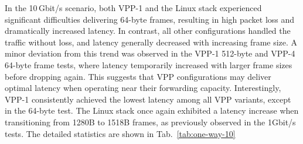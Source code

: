In the 10\,Gbit/s scenario, both VPP-1 and the Linux stack experienced significant difficulties delivering 64-byte frames, resulting in high packet loss and dramatically increased latency.
In contrast, all other configurations handled the traffic without loss, and latency generally decreased with increasing frame size.
A minor deviation from this trend was observed in the VPP-1 512-byte and VPP-4 64-byte frame tests, where latency temporarily increased with larger frame sizes before dropping again.
This suggests that VPP configurations may deliver optimal latency when operating near their forwarding capacity.
Interestingly, VPP-1 consistently achieved the lowest latency among all VPP variants, except in the 64-byte test.
The Linux stack once again exhibited a latency increase when transitioning from 1280B to 1518B frames, as previously observed in the 1Gbit/s tests.
The detailed statistics are shown in Tab.~\ref{tab:one-way-10}

